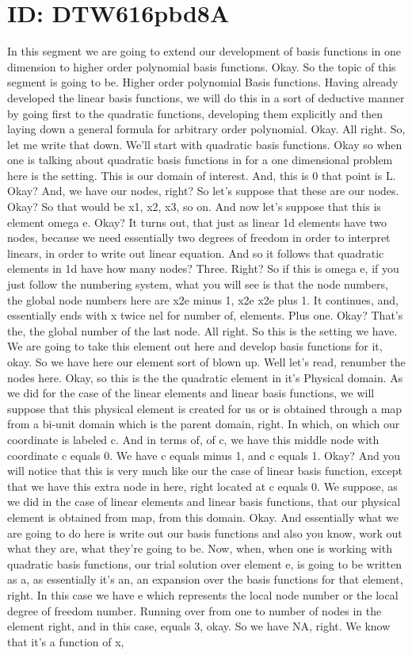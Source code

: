 \documentclass[10pt]{article}
\begin{document}
\section*{ID: DTW616pbd8A}
In this segment we are going to extend our development of basis functions in one dimension to higher order polynomial basis functions. Okay. So the topic of this segment is going to be. Higher order polynomial Basis functions. Having already developed the linear basis functions, we will do this in a sort of deductive manner by going first to the quadratic functions, developing them explicitly and then laying down a general formula for arbitrary order polynomial. Okay. All right. So, let me write that down. We'll start with quadratic basis functions. Okay so when one is talking about quadratic basis functions in for a one dimensional problem here is the setting. This is our domain of interest. And, this is 0 that point is L. Okay? And, we have our nodes, right? So let's suppose that these are our nodes. Okay? So that would be x1, x2, x3, so on. And now let's suppose that this is element omega e. Okay? It turns out, that just as linear 1d elements have two nodes, because we need essentially two degrees of freedom in order to interpret linears, in order to write out linear equation. And so it follows that quadratic elements in 1d have how many nodes? Three. Right? So if this is omega e, if you just follow the numbering system, what you will see is that the node numbers, the global node numbers here are x2e minus 1, x2e x2e plus 1. It continues, and, essentially ends with x twice nel for number of, elements. Plus one. Okay? That's the, the global number of the last node. All right. So this is the setting we have. We are going to take this element out here and develop basis functions for it, okay. So we have here our element sort of blown up. Well let's read, renumber the nodes here. Okay, so this is the the quadratic element in it's Physical domain. As we did for the case of the linear elements and linear basis functions, we will suppose that this physical element is created for us or is obtained through a map from a bi-unit domain which is the parent domain, right. In which, on which our coordinate is labeled c. And in terms of, of c, we have this middle node with coordinate c equals 0. We have c equals minus 1, and c equals 1. Okay? And you will notice that this is very much like our the case of linear basis function, except that we have this extra node in here, right located at c equals 0. We suppose, as we did in the case of linear elements and linear basis functions, that our physical element is obtained from map, from this domain. Okay. And essentially what we are going to do here is write out our basis functions and also you know, work out what they are, what they're going to be. Now, when, when one is working with quadratic basis functions, our trial solution over element e, is going to be written as a, as essentially it's an, an expansion over the basis functions for that element, right. In this case we have e which represents the local node number or the local degree of freedom number. Running over from one to number of nodes in the element right, and in this case, equals 3, okay. So we have NA, right. We know that it's a function of x, 
\end{document}
